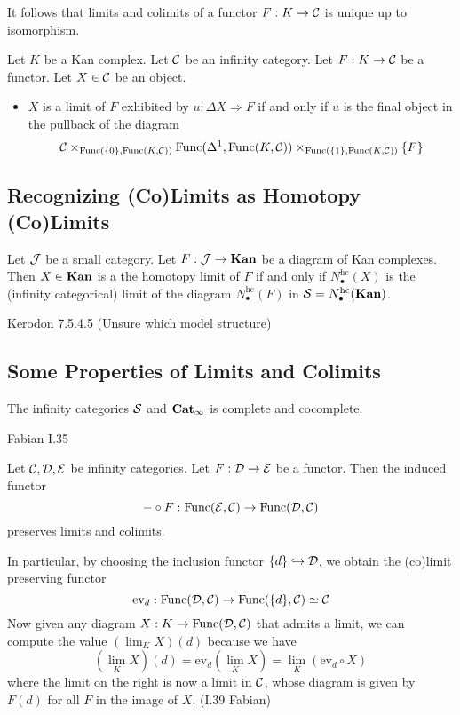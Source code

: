 \documentclass[a4paper]{article}
\begin{document}
It follows that limits and colimits of a functor $F:K\to\mathcal{C}$ is unique up to isomorphism. 

\begin{prp}{}{} Let $K$ be a Kan complex. Let $\mathcal{C}$ be an infinity category. Let $F:K\to\mathcal{C}$ be a functor. Let $X\in\mathcal{C}$ be an object. 
\begin{itemize}
\item $X$ is a limit of $F$ exhibited by $u:\Delta X\Rightarrow F$ if and only if $u$ is the final object in the pullback of the diagram $$\mathcal{C}\times_{\text{Func}(\{0\},\text{Func}(K,\mathcal{C}))}\text{Func}(\Delta^1,\text{Func}(K,\mathcal{C}))\times_{\text{Func}(\{1\},\text{Func}(K,\mathcal{C}))}\{F\}$$
\end{itemize}
\end{prp}

\subsection{Recognizing (Co)Limits as Homotopy (Co)Limits}
\begin{prp}{}{} Let $\mathcal{J}$ be a small category. Let $F:\mathcal{J}\to\bold{Kan}$ be a diagram of Kan complexes. Then $X\in\bold{Kan}$ is a the homotopy limit of $F$ if and only if $N_\bullet^\text{hc}(X)$ is the (infinity categorical) limit of the diagram $N_\bullet^\text{hc}(F)$ in $\mathcal{S}=N_\bullet^\text{hc}(\bold{Kan})$. 
\end{prp}

Kerodon 7.5.4.5 (Unsure which model structure)

\subsection{Some Properties of Limits and Colimits}
\begin{prp}{}{} The infinity categories $\mathcal{S}$ and $\bold{Cat}_\infty$ is complete and cocomplete. 
\end{prp}

Fabian I.35

\begin{prp}{}{} Let $\mathcal{C},\mathcal{D},\mathcal{E}$ be infinity categories. Let $F:\mathcal{D}\to\mathcal{E}$ be a functor. Then the induced functor $$-\circ F:\text{Func}(\mathcal{E},\mathcal{C})\to\text{Func}(\mathcal{D},\mathcal{C})$$ preserves limits and colimits. 
\end{prp}

In particular, by choosing the inclusion functor $\{d\}\hookrightarrow\mathcal{D}$, we obtain the (co)limit preserving functor $$\text{ev}_d:\text{Func}(\mathcal{D},\mathcal{C})\to\text{Func}(\{d\},\mathcal{C})\simeq\mathcal{C}$$ Now given any diagram $X:K\to\text{Func}(\mathcal{D},\mathcal{C})$ that admits a limit, we can compute the value $\left(\lim_K X\right)(d)$ because we have $$\left(\lim_K X\right)(d)=\text{ev}_d\left(\lim_KX\right)=\lim_K(\text{ev}_d\circ X)$$ where the limit on the right is now a limit in $\mathcal{C}$, whose diagram is given by $F(d)$ for all $F$ in the image of $X$. (I.39 Fabian)
\end{document}
